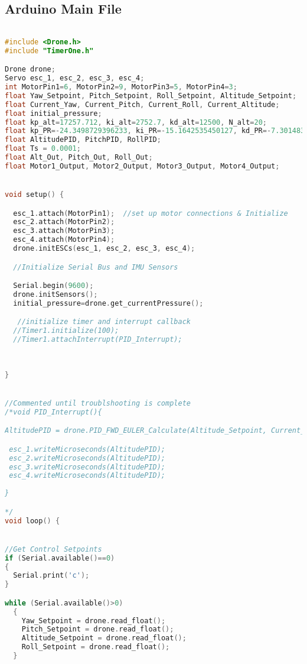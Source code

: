 \subsection{Arduino Main File}
\lstset{basicstyle=\tiny}
\begin{lstlisting}[language=C,caption={Main.ino Drone Flight Program},label={lst:main.ino}]

#include <Drone.h>
#include "TimerOne.h"

Drone drone;
Servo esc_1, esc_2, esc_3, esc_4;
int MotorPin1=6, MotorPin2=9, MotorPin3=5, MotorPin4=3;
float Yaw_Setpoint, Pitch_Setpoint, Roll_Setpoint, Altitude_Setpoint;
float Current_Yaw, Current_Pitch, Current_Roll, Current_Altitude;
float initial_pressure;
float kp_alt=17257.712, ki_alt=2752.7, kd_alt=12500, N_alt=20;
float kp_PR=-24.3498729396233, ki_PR=-15.1642535450127, kd_PR=-7.30148358076729, N_PR=44.9852981416911;
float AltitudePID, PitchPID, RollPID;
float Ts = 0.0001;
float Alt_Out, Pitch_Out, Roll_Out;
float Motor1_Output, Motor2_Output, Motor3_Output, Motor4_Output;


void setup() {

  esc_1.attach(MotorPin1);  //set up motor connections & Initialize
  esc_2.attach(MotorPin2);
  esc_3.attach(MotorPin3);
  esc_4.attach(MotorPin4);
  drone.initESCs(esc_1, esc_2, esc_3, esc_4);

  //Initialize Serial Bus and IMU Sensors

  Serial.begin(9600);
  drone.initSensors();
  initial_pressure=drone.get_currentPressure();

   //initialize timer and interrupt callback
  //Timer1.initialize(100);                      
  //Timer1.attachInterrupt(PID_Interrupt);
   
   
  
}


//Commented until troublshooting is complete
/*void PID_Interrupt(){

AltitudePID = drone.PID_FWD_EULER_Calculate(Altitude_Setpoint, Current_Altitude, kp, kd, ki, Ts);

 esc_1.writeMicroseconds(AltitudePID);
 esc_2.writeMicroseconds(AltitudePID);
 esc_3.writeMicroseconds(AltitudePID);
 esc_4.writeMicroseconds(AltitudePID);
  
}

*/
void loop() {


//Get Control Setpoints
if (Serial.available()==0)
{
  Serial.print('c');
}

while (Serial.available()>0)
  {
    Yaw_Setpoint = drone.read_float();
    Pitch_Setpoint = drone.read_float();
    Altitude_Setpoint = drone.read_float();
    Roll_Setpoint = drone.read_float(); 
  }
  


\end{lstlisting}
